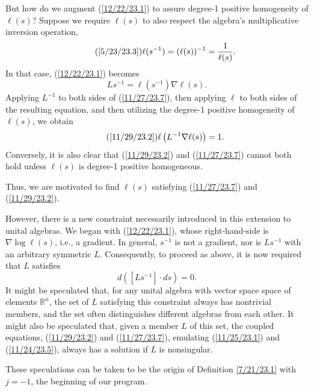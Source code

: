 \documentclass{amsart}
\numberwithin{equation}{section}
\theoremstyle{definition}
\numberwithin{theorem}{section}
\begin{document}
  But how do we augment (\ref{12/22/23.1}) to assure degree-1 positive homogeneity of $\ell(s)$?  Suppose we require $\ell(s)$ to also respect the algebra's multiplicative inversion operation, \begin{equation}\tag{\ref{5/23/23.3}} \ell(s^{-1}) = (\ell(s))^{-1} = \frac{1}{\ell(s)}.\end{equation}   In that case, (\ref{12/22/23.1}) becomes \begin{equation}\label{11/27/23.7} Ls^{-1} = \ell(s^{-1})\nabla\ell(s).\end{equation}  Applying $L^{-1}$ to both sides of (\ref{11/27/23.7}), then applying $\ell$ to both sides of the resulting equation, and then utilizing the degree-1 positive homogeneity of $\ell(s)$, we obtain
\begin{equation}\tag{\ref{11/29/23.2}}\ell\left(L^{-1}\nabla\ell(s)\right) = 1.\end{equation}  Conversely, it is also clear that (\ref{11/29/23.2}) and (\ref{11/27/23.7}) cannot both hold unless $\ell(s)$ is degree-1 positive homogeneous.
  
  Thus, we are motivated to find $\ell(s)$ satisfying (\ref{11/27/23.7}) and (\ref{11/29/23.2}).
  
  However, there is a new constraint necessarily introduced in this extension to unital algebras.  We began with (\ref{12/22/23.1}), whose right-hand-side is $\nabla\log\ell(s)$, i.e., a gradient.  In general, $s^{-1}$ is not a gradient, nor is $Ls^{-1}$ with an arbitrary symmetric $L$. Consequently, to proceed as above, it is now required that $L$ satisfies \[ d([Ls^{-1}]\cdot ds) = 0.\]  It might be speculated that, for any unital algebra with vector space space of elements $\mathbb{R}^n$, the set of $L$ satisfying this constraint always has nontrivial members, and the set often distinguishes different algebras from each other.  It might also be speculated that, given a member $L$ of this set,  the coupled equations, (\ref{11/29/23.2}) and (\ref{11/27/23.7}), emulating (\ref{11/25/23.1}) and (\ref{11/24/23.5}), always has a solution if $L$ is nonsingular.
  
  \enlargethispage{1cm}
  
These speculations can be taken to be the origin of Definition \ref{7/21/23.1} with $j=-1$, the beginning of our program.
  
  \bigskip
  
\end{document}
